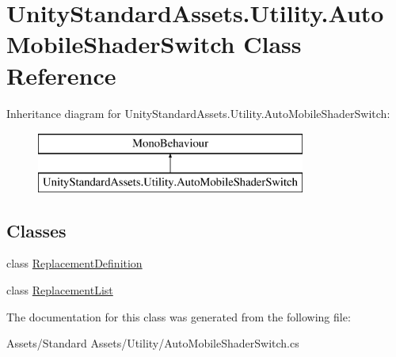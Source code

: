 \hypertarget{class_unity_standard_assets_1_1_utility_1_1_auto_mobile_shader_switch}{}\section{Unity\+Standard\+Assets.\+Utility.\+Auto\+Mobile\+Shader\+Switch Class Reference}
\label{class_unity_standard_assets_1_1_utility_1_1_auto_mobile_shader_switch}
Inheritance diagram for Unity\+Standard\+Assets.\+Utility.\+Auto\+Mobile\+Shader\+Switch\+:\begin{figure}[H]
\begin{center}
\leavevmode
\includegraphics[height=2.000000cm]{class_unity_standard_assets_1_1_utility_1_1_auto_mobile_shader_switch}
\end{center}
\end{figure}
\subsection*{Classes}
\begin{DoxyCompactItemize}
\item 
class \hyperlink{class_unity_standard_assets_1_1_utility_1_1_auto_mobile_shader_switch_1_1_replacement_definition}{Replacement\+Definition}
\item 
class \hyperlink{class_unity_standard_assets_1_1_utility_1_1_auto_mobile_shader_switch_1_1_replacement_list}{Replacement\+List}
\end{DoxyCompactItemize}


The documentation for this class was generated from the following file\+:\begin{DoxyCompactItemize}
\item 
Assets/\+Standard Assets/\+Utility/Auto\+Mobile\+Shader\+Switch.\+cs\end{DoxyCompactItemize}

